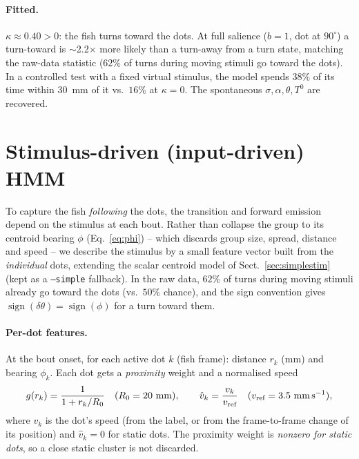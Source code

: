\documentclass[11pt]{article}
\newcommand{\plotph}[1]{%
  \begin{center}\fbox{\parbox[c][3cm][c]{0.8\linewidth}{%
  \centering\itshape [Plot placeholder: #1]}}\end{center}}
\begin{document}
\paragraph{Fitted.}
$\kappa\approx0.40>0$: the fish turns toward the dots. At full salience ($b=1$,
dot at $90^\circ$) a turn-toward is $\sim$2.2$\times$ more likely than a turn-away
from a turn state, matching the raw-data statistic ($62\%$ of turns during moving
stimuli go toward the dots). In a controlled test with a fixed virtual stimulus,
the model spends $38\%$ of its time within 30~mm of it vs.\ $16\%$ at $\kappa=0$.
The spontaneous $\sigma,\alpha,\theta,T^0$ are recovered.

\plotph{Following bias $P(\text{turn}\pm\mid\text{turn state})$ vs.\ $b=\sin\phi$
        for the fitted $\kappa$; controlled $\kappa{=}0$ vs.\ fitted-$\kappa$ demo
        (notebook \texttt{fit\_hmm\_stim.ipynb}, \texttt{--simple}).}


\section{Stimulus-driven (input-driven) HMM}
\label{sec:iohmm}

To capture the fish \emph{following} the dots, the transition and forward emission
depend on the stimulus at each bout. Rather than collapse the group to its
centroid bearing $\phi$ (Eq.~\eqref{eq:phi}) -- which discards group size, spread,
distance and speed -- we describe the stimulus by a small feature vector built
from the \emph{individual} dots, extending the scalar centroid model of
Sect.~\ref{sec:simplestim} (kept as a \texttt{--simple} fallback). In the raw data, $62\%$ of turns
during moving stimuli already go toward the dots (vs.\ $50\%$ chance), and the
sign convention gives $\operatorname{sign}(\delta\theta)=\operatorname{sign}(\phi)$
for a turn toward them.

\paragraph{Per-dot features.}
At the bout onset, for each active dot $k$ (fish frame): distance $r_k$ (mm) and
bearing $\phi_k$. Each dot gets a \emph{proximity} weight and a normalised speed
\[
g(r_k)=\frac{1}{1+r_k/R_0}\quad(R_0=20~\text{mm}),\qquad
\hat v_k=\frac{v_k}{v_{\text{ref}}}\quad(v_{\text{ref}}=3.5~\text{mm\,s}^{-1}),
\]
where $v_k$ is the dot's speed (from the label, or from the frame-to-frame change
of its position) and $\hat v_k=0$ for static dots. The proximity weight is
\emph{nonzero for static dots}, so a close static cluster is not discarded.
\end{document}
